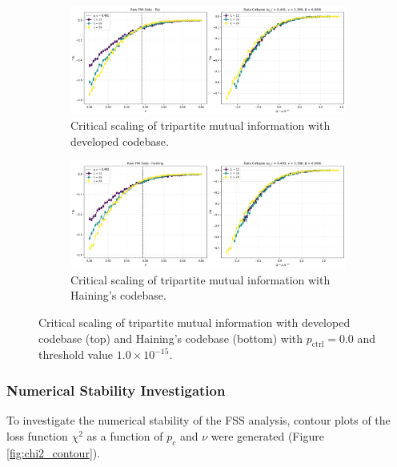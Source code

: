 \documentclass[11pt,a4paper]{article}
\begin{document}
\begin{figure}[H]
    \centering
    \begin{subfigure}[t]{0.8\linewidth}
        \centering
        \includegraphics[width=\linewidth]{data_collapse_tao_pctrl0.000_threshold1.0e-15.png}
        \caption{Critical scaling of tripartite mutual information with developed codebase.}
        \label{fig:fss_analysis_developed}
    \end{subfigure}
    \vfill
    \begin{subfigure}[b]{0.8\linewidth}
        \centering
        \includegraphics[width=\linewidth]{data_collapse_haining_pctrl0.000_threshold1.0e-15.png}
        \caption{Critical scaling of tripartite mutual information with Haining's codebase.}
        \label{fig:fss_analysis_haining}
    \end{subfigure}
    \caption{Critical scaling of tripartite mutual information with developed codebase (top) and Haining's codebase (bottom) with $p_\text{ctrl}=0.0$ and threshold value $1.0\times10^{-15}$.}
    \label{fig:fss_analysis_comparison}
\end{figure}

\subsubsection{Numerical Stability Investigation}

To investigate the numerical stability of the FSS analysis, contour plots of the loss function $\chi^2$ as a function of $p_c$ and $\nu$ were generated (Figure \ref{fig:chi2_contour}).
\end{document}
